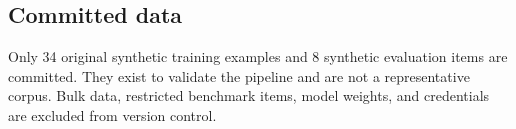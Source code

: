 \subsection{Committed data}

Only 34 original synthetic training examples and 8 synthetic evaluation items
are committed. They exist to validate the pipeline and are not a representative
corpus. Bulk data, restricted benchmark items, model weights, and credentials
are excluded from version control.
